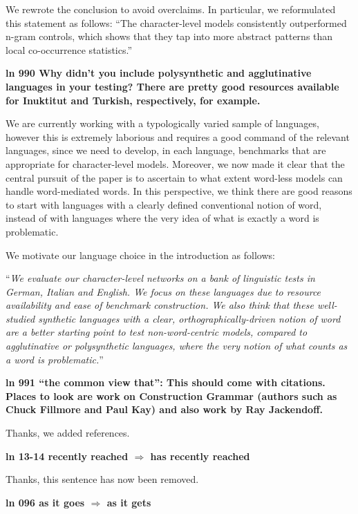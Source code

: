 \documentclass{article}
\begin{document}
We rewrote the conclusion to avoid overclaims. In particular, we reformulated this statement as follows: ``The character-level models consistently outperformed n-gram controls, which shows that they tap into more abstract patterns than local co-occurrence statistics.''
\newline

\textbf{ln 990 Why didn't you include polysynthetic and agglutinative languages in your testing? There are pretty good resources available for Inuktitut and Turkish, respectively, for example.}

We are currently working with a typologically varied sample of languages, however this is extremely laborious and requires a good command of the relevant languages, since we need to develop, in each language, benchmarks that are appropriate for character-level models. Moreover, we now made it clear that the central pursuit of the paper is to ascertain to what extent word-less models can handle word-mediated words. In this perspective, we think there are good reasons to start with languages with a clearly defined conventional notion of word, instead of with languages where the very idea of what is exactly a word is problematic.

We motivate our language choice in the introduction as follows:

``\textit{We evaluate our character-level networks on a bank of linguistic tests in German, Italian and English. We focus on these languages due to resource availability and ease of benchmark construction. We also think that these well-studied synthetic languages with a clear, orthographically-driven notion of word are a better starting point to test non-word-centric models, compared to agglutinative or polysynthetic languages, where the very notion of what counts as a word is problematic.}''
\newline

\textbf{ln 991 ``the common view that'': This should come with citations. Places to look are work on Construction Grammar (authors such as Chuck Fillmore and Paul Kay) and also work by Ray Jackendoff.}

Thanks, we added references.
\newline

\textbf{ln 13-14 recently reached $\Rightarrow$ has recently reached}

Thanks, this sentence has now been removed.
\newline

\textbf{ln 096 as it goes $\Rightarrow$ as it gets}
\end{document}
